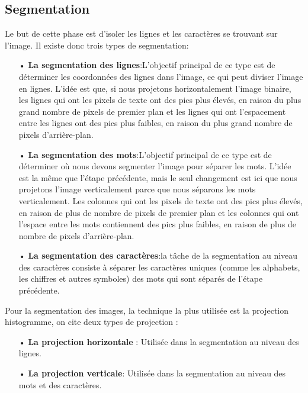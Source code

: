     \subsection{Segmentation}
    Le but de cette phase est d'isoler les lignes et les  caractères se trouvant sur l'image. Il existe donc trois types de segmentation:
        \begin{itemize}
            \item[•]\textbf{La segmentation des lignes}:L'objectif principal de ce type est de déterminer les coordonnées des lignes dans l'image, ce qui peut diviser l'image en lignes. L’idée est que, si nous projetons horizontalement l'image binaire, les lignes qui ont les pixels de texte ont des pics plus élevés, en raison du plus grand nombre de pixels de premier plan et les lignes qui ont l'espacement entre les lignes ont des pics plus faibles, en raison du plus grand nombre de pixels d'arrière-plan. 
            \item[•]\textbf{La segmentation des mots}:L'objectif principal de ce type est de déterminer où nous devons segmenter l'image pour séparer les mots. L’idée est la même que l'étape précédente, mais le seul changement est ici que nous projetons l'image verticalement parce que nous séparons les mots verticalement. Les colonnes qui ont les pixels de texte ont des pics plus élevés, en raison de plus de nombre de pixels de premier plan et les colonnes qui ont l'espace entre les mots contiennent des pics plus faibles, en raison de plus de nombre de pixels d'arrière-plan.
            \item[•]\textbf{La segmentation des caractères}:la tâche de la segmentation au niveau des caractères consiste à séparer les caractères uniques (comme les alphabets, les chiffres et autres symboles) des mots qui sont séparés de l'étape précédente.
        \end{itemize}
    Pour la segmentation des images, la technique la plus utilisée est la projection histogramme, on cite deux types de projection :
        \begin{itemize}
            \item[•]\textbf{La projection horizontale} : Utilisée dans la segmentation au niveau des lignes.
            \item[•]\textbf{La projection verticale}: Utilisée dans la segmentation au niveau des mots et des caractères.
        \end{itemize}
